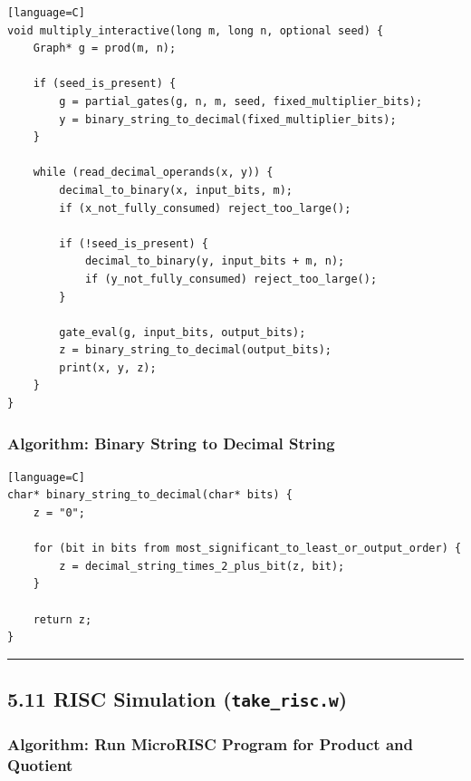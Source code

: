 \documentclass[11pt]{article}
\begin{document}
\begin{verbatim}[language=C]
void multiply_interactive(long m, long n, optional seed) {
    Graph* g = prod(m, n);

    if (seed_is_present) {
        g = partial_gates(g, n, m, seed, fixed_multiplier_bits);
        y = binary_string_to_decimal(fixed_multiplier_bits);
    }

    while (read_decimal_operands(x, y)) {
        decimal_to_binary(x, input_bits, m);
        if (x_not_fully_consumed) reject_too_large();

        if (!seed_is_present) {
            decimal_to_binary(y, input_bits + m, n);
            if (y_not_fully_consumed) reject_too_large();
        }

        gate_eval(g, input_bits, output_bits);
        z = binary_string_to_decimal(output_bits);
        print(x, y, z);
    }
}
\end{verbatim}

\subsubsection{Algorithm: Binary String to Decimal String}\label{algorithm-binary-string-to-decimal-string}

\begin{verbatim}[language=C]
char* binary_string_to_decimal(char* bits) {
    z = "0";

    for (bit in bits from most_significant_to_least_or_output_order) {
        z = decimal_string_times_2_plus_bit(z, bit);
    }

    return z;
}
\end{verbatim}

\begin{center}\rule{0.5\linewidth}{0.5pt}\end{center}

\subsection{\texorpdfstring{5.11 RISC Simulation (\texttt{take\_risc.w})}{5.11 RISC Simulation (take\_risc.w)}}\label{risc-simulation-take_risc.w}

\subsubsection{Algorithm: Run MicroRISC Program for Product and Quotient}\label{algorithm-run-microrisc-program-for-product-and-quotient}
\end{document}
